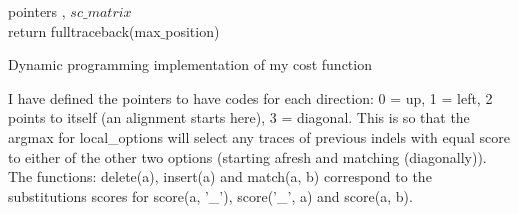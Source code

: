 \documentclass{mm2}
\begin{document}
\begin{algorithm}[H]
 \State pointers , 
 \State $ sc\_matrix $ \\
 \EndFor
 return fulltraceback(max$\_$position)
 \caption{Dynamic programming implementation of my cost function}
\end{algorithm}
I have defined the pointers to have codes for each direction: 0 = up, 1 = left, 2 points to itself (an alignment starts here), 3 = diagonal. This is so that the argmax for local\_options will select any traces of previous indels with equal score to either of the other two options (starting afresh and matching (diagonally)). The functions: delete(a), insert(a) and match(a, b) correspond to the substitutions scores for score(a, '\_'), score('\_', a) and score(a, b).

\nopagebreak
\end{document}
